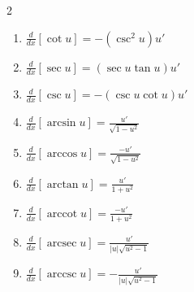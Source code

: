\documentclass[12pt, letterpaper]{article}
\DeclareMathOperator{\arccot}{arccot}
\DeclareMathOperator{\arcsec}{arcsec}
\DeclareMathOperator{\arccsc}{arccsc}
\begin{document}
\begin{definition}[title=Basic Differentiation Rules for Elementary Functions]
\begin{multicols}{2}
\begin{enumerate}
        \item $\displaystyle \frac{d}{dx}[\cot u]
        = -(\csc^{2}u)u'$
        
        \item $\displaystyle \frac{d}{dx}[\sec u]
        = (\sec u \tan u)u'$
        
        \item $\displaystyle \frac{d}{dx}[\csc u]
        = -(\csc u \cot u)u'$
        
        \item $\displaystyle \frac{d}{dx}[\arcsin u]
        = \frac{u'}{\sqrt{1-u^{2}}}$
        
        \item $\displaystyle \frac{d}{dx}[\arccos u]
        = \frac{-u'}{\sqrt{1-u^{2}}}$
        
        \item $\displaystyle \frac{d}{dx}[\arctan u]
        = \frac{u'}{1+u^{2}}$
        
        \item $\displaystyle \frac{d}{dx}[\arccot u]
        = \frac{-u'}{1+u^{2}}$
        
        \item $\displaystyle \frac{d}{dx}[\arcsec u]
        = \frac{u'}{|u|\sqrt{u^{2}-1}}$

        \item $\displaystyle \frac{d}{dx}[\arccsc u]
        = -\frac{u'}{|u|\sqrt{u^{2}-1}}$
        \end{enumerate}
    \end{multicols}
\end{definition}

\newpage
\end{document}

